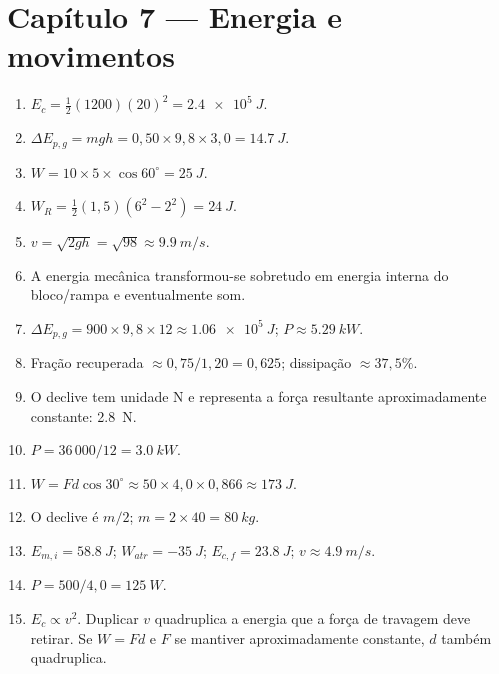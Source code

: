 \documentclass[11pt,a4paper,oneside]{book}
\begin{document}
\section*{Capítulo 7 — Energia e movimentos}
\begin{enumerate}
  \item $E_c=\frac12(1200)(20)^2=\SI{2.4e5}{J}$.
  \item $\Delta E_{p,g}=mgh=0{,}50\times9{,}8\times3{,}0=\SI{14.7}{J}$.
  \item $W=10\times5\times\cos60^\circ=\SI{25}{J}$.
  \item $W_R=\frac12(1{,}5)(6^2-2^2)=\SI{24}{J}$.
  \item $v=\sqrt{2gh}=\sqrt{98}\approx\SI{9.9}{m/s}$.
  \item A energia mecânica transformou-se sobretudo em energia interna do bloco/rampa e eventualmente som.
  \item $\Delta E_{p,g}=900\times9{,}8\times12\approx\SI{1.06e5}{J}$; $P\approx\SI{5.29}{kW}$.
  \item Fração recuperada $\approx0{,}75/1{,}20=0{,}625$; dissipação $\approx37{,}5\%$.
  \item O declive tem unidade N e representa a força resultante aproximadamente constante: \SI{2.8}{N}.
  \item $P=36\,000/12=\SI{3.0}{kW}$.
  \item $W=Fd\cos30^\circ\approx50\times4{,}0\times0{,}866\approx\SI{173}{J}$.
  \item O declive é $m/2$; $m=2\times40=\SI{80}{kg}$.
  \item $E_{m,i}=\SI{58.8}{J}$; $W_{atr}=\SI{-35}{J}$; $E_{c,f}=\SI{23.8}{J}$; $v\approx\SI{4.9}{m/s}$.
  \item $P=500/4{,}0=\SI{125}{W}$.
  \item $E_c\propto v^2$. Duplicar $v$ quadruplica a energia que a força de travagem deve retirar. Se $W=F d$ e $F$ se mantiver aproximadamente constante, $d$ também quadruplica.
\end{enumerate}
\end{document}

